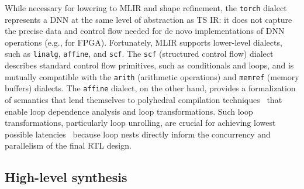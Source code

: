 \documentclass[10pt]{sig-alternate}
\begin{document}
While necessary for lowering to MLIR
and shape refinement,  the \texttt{torch} dialect represents a DNN at the same
level of abstraction as TS IR: it does not capture the precise data and control flow needed for de novo implementations of DNN
operations (e.g., for FPGA). Fortunately, MLIR supports lower-level
dialects, such as \texttt{linalg}, \texttt{affine}, and \texttt{scf}. The \texttt{scf} (structured control flow) dialect describes
standard control flow primitives, such as conditionals and loops,
and is mutually compatible with the \texttt{arith} (arithmetic operations)
and \texttt{memref} (memory buffers) dialects. The \texttt{affine}
dialect, on the other hand, provides a formalization of semantics
that lend themselves to polyhedral compilation techniques~\cite{polyhedral-mlir} that enable loop dependence analysis and loop transformations.
Such loop transformations, particularly loop unrolling, are crucial
for achieving lowest possible latencies~\cite{yehpca2022scalehls}
because loop nests directly inform the concurrency and parallelism
of the final RTL design.

\subsection{High-level synthesis}\label{subsec:High-level-synthesis}
\end{document}
